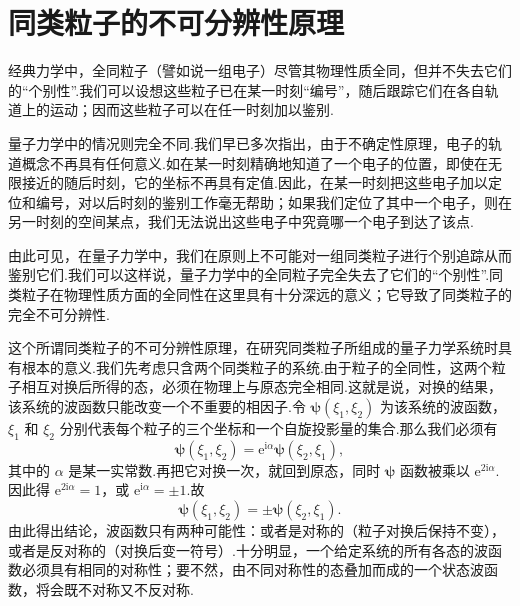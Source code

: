 \newcommand{\yh}[3]{\put(#1,#2){\line(1,0){#3}}}%
\newcommand{\yv}[3]{\put(#1,#2){\line(0,1){#3}}}%
\newcommand{\ybl}[3]{\put(#1,#2){\makebox(0,0)[b]{\small #3}}}%
\newcommand{\ytl}[3]{\put(#1,#2){\makebox(0,0)[t]{\small #3}}}%
\newcommand{\ydh}[3]{\put(#1,#2){\dashbox{2.4}(#3,0){}}}%
\newcommand{\ydv}[3]{\put(#1,#2){\dashbox{2.4}(0,#3){}}}%

\section{同类粒子的不可分辨性原理}

经典力学中，全同粒子（譬如说一组电子）尽管其物理性质全同，但并不失去它们的“个别性”.我们可以设想这些粒子已在某一时刻“编号”，随后跟踪它们在各自轨道上的运动；因而这些粒子可以在任一时刻加以鉴别.

量子力学中的情况则完全不同.我们早已多次指出，由于不确定性原理，电子的轨道概念不再具有任何意义.如在某一时刻精确地知道了一个电子的位置，即使在无限接近的随后时刻，它的坐标不再具有定值.因此，在某一时刻把这些电子加以定位和编号，对以后时刻的鉴别工作毫无帮助；如果我们定位了其中一个电子，则在另一时刻的空间某点，我们无法说出这些电子中究竟哪一个电子到达了该点.

由此可见，在量子力学中，我们在原则上不可能对一组同类粒子进行个别追踪从而鉴别它们.我们可以这样说，量子力学中的全同粒子完全失去了它们的“个别性”.同类粒子在物理性质方面的全同性在这里具有十分深远的意义；它导致了同类粒子的完全不可分辨性.

这个所谓同类粒子的不可分辨性原理，在研究同类粒子所组成的量子力学系统时具有根本的意义.我们先考虑只含两个同类粒子的系统.由于粒子的全同性，这两个粒子相互对换后所得的态，必须在物理上与原态完全相同.这就是说，对换的结果，该系统的波函数只能改变一个不重要的相因子.令 $\boldsymbol{\psi}(\xi_1,\xi_2)$ 为该系统的波函数，$\xi_1$ 和 $\xi_2$ 分别代表每个粒子的三个坐标和一个自旋投影量的集合.那么我们必须有
\begin{equation*}
  \boldsymbol{\psi}(\xi_1,\xi_2)=\mathrm{e}^{\mathrm{i}\alpha}\boldsymbol{\psi}(\xi_2,\xi_1),
\end{equation*}
其中的 $\alpha$ 是某一实常数.再把它对换一次，就回到原态，同时 $\boldsymbol{\psi}$ 函数被乘以 $\mathrm{e}^{2\mathrm{i}\alpha}$.因此得 $\mathrm{e}^{2\mathrm{i}\alpha}=1$，或 $\mathrm{e}^{\mathrm{i}\alpha}=\pm 1$.故
\begin{equation*}
  \boldsymbol{\psi}(\xi_1,\xi_2)=\pm\boldsymbol{\psi}(\xi_2,\xi_1).
\end{equation*}
由此得出结论，波函数只有两种可能性：或者是对称的（粒子对换后保持不变），或者是反对称的（对换后变一符号）.十分明显，一个给定系统的所有各态的波函数必须具有相同的对称性；要不然，由不同对称性的态叠加而成的一个状态波函数，将会既不对称又不反对称.


